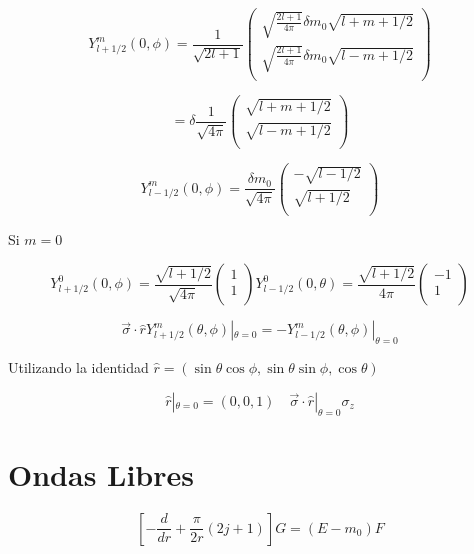 \documentclass{report}
\begin{document}
\[Y_{l+1/2}^{m} (0,\phi) = \frac{1}{\sqrt{2l+1}} \left ( \begin{array}{cc}
 \sqrt{\frac{2l+1}{4\pi}} \delta m_0 \sqrt{l+m+1/2}    \\
 \sqrt{\frac{2l+1}{4\pi}} \delta m_0 \sqrt{l-m+1/2}   \\
 \end{array} \right) \]

\[= \delta \frac{1}{\sqrt{4 \pi}} \left ( \begin{array}{cc}
 \sqrt{l+m+1/2}   \\
  \sqrt{l-m+1/2}  \\
 \end{array} \right) \]

\[Y_{l-1/2}^{m} (0,\phi) = \frac{\delta m_0 }{\sqrt{4\pi}} \left ( \begin{array}{cc}
 -\sqrt{l-1/2}   \\
 \sqrt{l+1/2}   \\
 \end{array} \right) \]

Si $m=0$

\[Y_{l+1/2} ^{0} (0,\phi) = \frac{\sqrt{l+1/2}}{\sqrt{4\pi}} \left ( \begin{array}{cc}
 1   \\
 1   \\
 \end{array} \right) Y_{l-1/2}^{0} (0,\theta) = \frac{\sqrt{l+1/2}}{4\pi} \left ( \begin{array}{cc}
 -1   \\
 1   \\
 \end{array} \right)  \]

\[\overrightarrow{\sigma} \cdot \hat{r} Y_{l+1/2}^{m} (\theta , \phi) |_{\theta = 0} = - Y_{l-1/2}^{m} (\theta ,\phi )|_{\theta = 0}\]

Utilizando la identidad $\hat{r} = (\sin \theta \cos \phi , \sin \theta \sin \phi , \cos \theta)$

\[\hat{r} |_{\theta = 0} = (0,0,1) \quad \overrightarrow{\sigma} \cdot \hat{r} |_{\theta = 0} \sigma_{z}\]


\section{Ondas Libres}

\[[- \frac{d}{dr} + \frac{\pi}{2r} (2j+1) ] G = (E-m_0 )F\]
\end{document}
